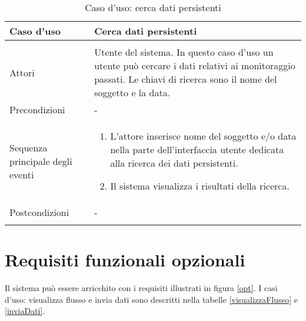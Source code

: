    \begin{table}
  \centering
  \begin{tabular}{p{} p{}}
  \\
  \hline
      Caso d'uso 
    & 
      Cerca dati persistenti
  \\
  \hline\\
      Attori
    &
      Utente del sistema. In questo caso d'uso un utente pu\`o cercare i dati relativi ai monitoraggio passati. Le chiavi di ricerca sono il nome del soggetto e la data.
  \\
      Precondizioni
    &
      -
  \\
      Sequenza principale degli eventi
    &
      \begin{enumerate}
	\item 
	  L'attore inserisce nome del soggetto e/o data nella parte dell'interfaccia utente dedicata alla ricerca dei dati persistenti.
	\item
	  Il sistema visualizza i risultati della ricerca.
      \end{enumerate}      
  \\
      Postcondizioni
    &
      -
  \\\\
  \hline
  \end{tabular}
   \caption{Caso d'uso: cerca dati persistenti}
   \label{casoDUsoCercaDatiPersistenti}
   \end{table}





\section{Requisiti funzionali opzionali}

Il sistema pu\`o essere arricchito con i requisiti illustrati in figura \ref{opt}. I casi d'uso: visualizza flusso e invia dati sono descritti nella tabelle \ref{visualizzaFlusso} e \ref{inviaDati}.


